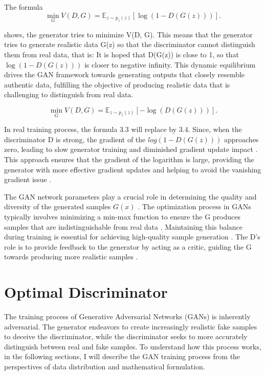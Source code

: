 The formula
\begin{equation}
    \min_{G} V(D, G) = \mathbb{E}_{z \sim p_{z}(z)} [\log(1 - D(G(z)))].
\end{equation}

shows, the generator tries to minimize V(D, G). 
This means that the generator tries to generate realistic data G(z) so that the discriminator cannot distinguish 
them from real data, that is: It is hoped that D(G(z)) is close to 1, so that $\log (1 - D(G(z)))$ is closer to negative infinity.
This dynamic equilibrium drives the GAN framework towards generating outputs that closely resemble authentic data, 
fulfilling the objective of producing realistic data that is challenging to distinguish from real data.


\begin{equation}
    \min_{G} V(D, G) = \mathbb{E}_{z \sim p_{z}(z)} [-\log(D(G(z)))].
\end{equation}

In real training process, the formula 3.3 will replace by 3.4. Since, when the discriminator D is strong, 
the gradient of the $log(1 - D(G(z)))$ approaches zero, leading to slow generator training and diminished gradient update impact \citep{10.1007/s11263-019-01265-2}.  
This approach ensures that the gradient of the logarithm is large, providing the generator with more effective gradient updates and 
helping to avoid the vanishing gradient issue \citep{10.1109/tpami.2018.2872043}.



The GAN network parameters play a crucial role in determining the quality and diversity of 
the generated samples $G(x)$ \citep{10.1007/s10928-021-09787-4}. The optimization process in GANs 
typically involves minimizing a min-max function to ensure the G produces samples that 
are indistinguishable from real data \citep{10.1109/taslp.2017.2761547}. Maintaining this balance 
during training is essential for achieving high-quality sample generation \citep{10.1007/s10928-021-09787-4}. 
The D's role is to provide feedback to the generator by acting as a critic, 
guiding the G towards producing more realistic samples \citep{10.48550/arxiv.1802.05637}.



\section*{Optimal Discriminator}

The training process of Generative Adversarial Networks (GANs) is inherently adversarial. 
The generator endeavors to create increasingly realistic fake samples to deceive the discriminator, 
while the discriminator seeks to more accurately distinguish between real and fake samples. 
To understand how this process works, in the following sections, 
I will describe the GAN training process from the perspectives of data distribution and mathematical formulation.

